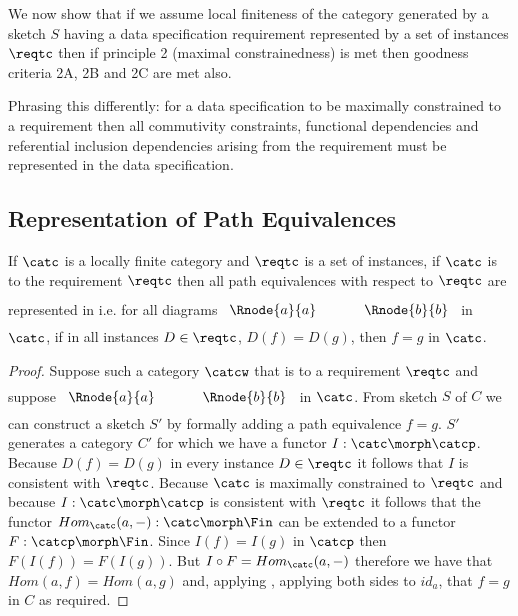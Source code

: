 We now show that if we assume local finiteness of the category \catcw generated by a sketch $S$   having a data specification requirement represented by a set of
instances $\reqtc$ then  if principle 2 (maximal constrainedness) is met then
goodness criteria 2A, 2B and 2C are met also. 

Phrasing this differently: for a data specification to be maximally constrained to a
requirement then  all commutivity constraints,  functional dependencies and referential inclusion dependencies arising from the requirement must be represented in the data specification.

\subsection{Representation of Path Equivalences}

\begin{lemma}
If $\catc$ is a locally finite category and $\reqtc$ is a set of instances, if $\catc$ is 
 to the requirement $\reqtc$ then all path equivalences with respect
to $\reqtc$ are represented in \catcw
i.e. for all diagrams
$
\rule[-0.3cm]{0pt}{0.9cm} %
\begin{array}{c p{0.5cm} c  }
 \Rnode{a}{a}            &&   \Rnode{b}{b}
\end{array} 
$
in $\catc$,  if in all instances $D \in \reqtc$, $D(f)=D(g)$, 
then $f=g$ in $\catc$.
\end{lemma}
\begin{proof}
Suppose such a category  $\catcw$  that  is 
 to a requirement $\reqtc$
and suppose 
$
\rule[-0.3cm]{0pt}{0.8cm} %
\begin{array}{c p{0.5cm} c  }
 \Rnode{a}{a}            &&   \Rnode{b}{b}
\end{array} 
$
in $\catc$. From sketch $S$ of $C$ we can construct a sketch $S'$ by formally adding a path equivalence $f=g$.
$S'$ generates a category $C'$ for which we have a functor $I: \catc \morph \catcp$. 
Because $D(f) = D(g)$ in every instance $D \in \reqtc$
it follows that $I$ is consistent with $\reqtc$. Because $\catc$ is maximally constrained to $\reqtc$
and because $I: \catc \morph \catcp$ is consistent with $\reqtc$ it follows that the functor $Hom_{\catc}(a,-): \catc \morph \Fin$ 
can be extended to a functor $F: \catcp \morph \Fin$. Since $I(f)=I(g)$ in $\catcp$ then $F(I(f))=F(I(g))$. But $I \circ F
= Hom_\catc(a,-)$ therefore we have that $Hom(a,f)=Hom(a,g)$ and, 
applying , applying both sides to $id_a$, that $f=g$ in $C$ as required.
\end{proof}

